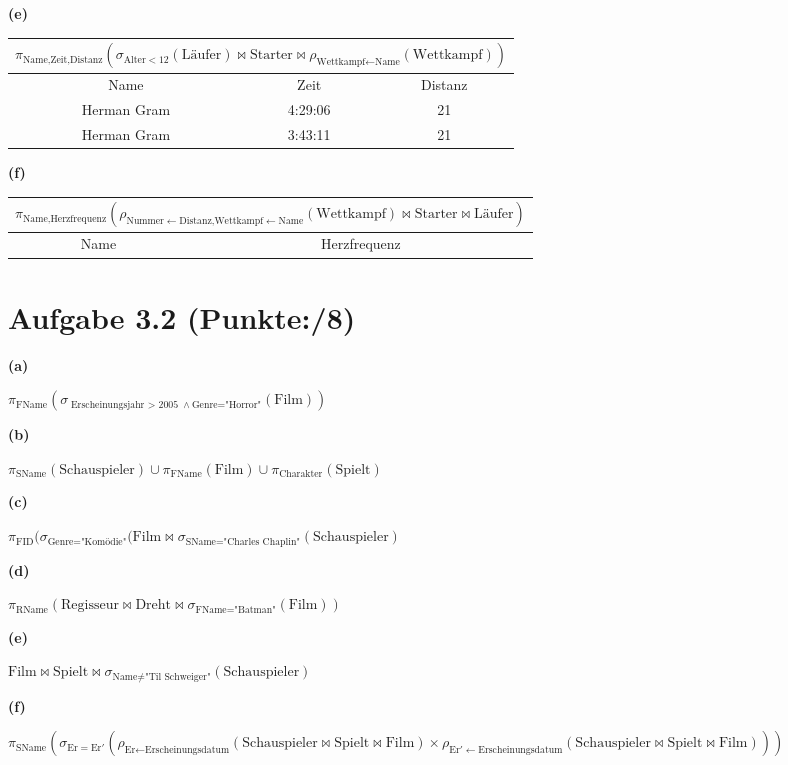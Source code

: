 \documentclass[11pt, a4paper]{article}
\newcommand{\blattnummer}{3}
\newcommand{\pp}{8}
\newcommand{\aufgabe}[2] {\section*{Aufgabe \blattnummer.#1 (Punkte:\qquad/#2)}}
\newcommand{\aufgabenteil}[1] {\textbf{(#1)}}
\begin{document}
\aufgabenteil{e}
\begin{adjustwidth}{20pt}{20pt}
\begin{tabular}{|c c c|}\hline
\multicolumn{3}{|c|}{$\pi_{\text{Name,Zeit,Distanz}}(\sigma_{\text{Alter}<12}(\text{Läufer})\bowtie\text{Starter}\bowtie\rho_{\text{Wettkampf$\leftarrow$Name}}(\text{Wettkampf}))$} \\\hline
Name & Zeit & Distanz \\\hline
Herman Gram & 4:29:06 & 21 \\
Herman Gram & 3:43:11 & 21 \\\hline
\end{tabular}
\end{adjustwidth}
\aufgabenteil{f}
\begin{adjustwidth}{20pt}{20pt}
\begin{tabular}{|c c|}\hline
\multicolumn{2}{|c|}{$\pi_{\text{Name,Herzfrequenz}}(\rho_{\text{Nummer$\leftarrow$Distanz,Wettkampf$\leftarrow$Name}}(\text{Wettkampf})\bowtie\text{Starter}\bowtie\text{Läufer})$} \\\hline
Name & Herzfrequenz \\\hline
\end{tabular}
\end{adjustwidth}


\aufgabe{2}{\pp}
\aufgabenteil{a}
\begin{adjustwidth}{20pt}{20pt}
$\pi_{\text{FName}}(\sigma_{\text{Erscheinungsjahr $>$ 2005} \wedge \text{Genre="Horror"} }(\text{Film}))$ 
\end{adjustwidth}
\aufgabenteil{b}
\begin{adjustwidth}{20pt}{20pt}
$\pi_{\text{SName}}(\text{Schauspieler}) \cup \pi_{\text{FName}}(\text{Film}) \cup \pi_{\text{Charakter}}(\text{Spielt})$
\end{adjustwidth}
\aufgabenteil{c}
\begin{adjustwidth}{20pt}{20pt}
$\pi_{\text{FID}}(\sigma_{\text{Genre="Komödie"} }(\text{Film} \bowtie \sigma_{\text{SName="Charles Chaplin"}}(\text{Schauspieler})$
\end{adjustwidth}
\aufgabenteil{d}
\begin{adjustwidth}{20pt}{20pt}
$\pi_{\text{RName}}(\text{Regisseur} \bowtie \text{Dreht} \bowtie \sigma_{\text{FName="Batman"}}(\text{Film}))$
\end{adjustwidth}
\aufgabenteil{e}
\begin{adjustwidth}{20pt}{20pt}
$\text{Film} \bowtie \text{Spielt} \bowtie \sigma_{\text{Name} \neq \text{"Til Schweiger"}}(\text{Schauspieler})$
\end{adjustwidth}
\aufgabenteil{f}
\begin{adjustwidth}{20pt}{20pt}
$\pi_{\text{SName}}(\sigma_{\text{Er} = \text{Er}\prime}(\rho_{\text{Er} \leftarrow \text{Erscheinungsdatum}}(\text{Schauspieler} \bowtie \text{Spielt} \bowtie \text{Film}) \times \rho_{\text{Er}\prime \leftarrow \text{Erscheinungsdatum}}(\text{Schauspieler} \bowtie \text{Spielt} \bowtie \text{Film})))$
\end{adjustwidth}
\end{document}
